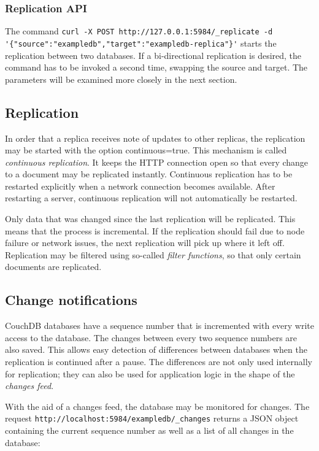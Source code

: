 \subsubsection{Replication API}

The command \lstinline!curl -X POST http://127.0.0.1:5984/_replicate -d '{"source":"exampledb","target":"exampledb-replica"}'! starts the replication between two databases. If a bi-directional replication is desired, the command has to be invoked a second time, swapping the source and target. The parameters will be examined more closely in the next section.

\subsection{Replication}
\label{subsec:replikation-praxis}

In order that a replica receives note of updates to other replicas, the replication may be started with the option {\selectfont continuous=true}. This mechanism is called \textit{continuous replication}. It keeps the HTTP connection open so that every change to a document may be replicated instantly. Continuous replication has to be restarted explicitly when a network connection becomes available. After restarting a server, continuous replication will not automatically be restarted.

Only data that was changed since the last replication will be replicated. This means that the process is incremental. If the replication should fail due to node failure or network issues, the next replication will pick up where it left off. Replication may be filtered using so-called \textit{filter functions}, so that only certain documents are replicated.


\subsection{Change notifications}
\label{subsec:change-notif}

CouchDB databases have a sequence number that is incremented with every write access to the database. The changes between every two sequence numbers are also saved. This allows easy detection of differences between databases when the replication is continued after a pause. The differences are not only used internally for replication; they can also be used for application logic in the shape of the \textit{changes feed}.

\lstset{language=bash}
With the aid of a changes feed, the database may be monitored for changes. The request \lstinline!http://localhost:5984/exampledb/_changes! returns a JSON object containing the current sequence number as well as a list of all changes in the database:

